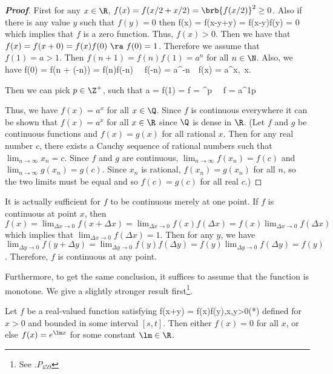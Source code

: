 \begin{proof}[\bf Proof]
First for any $x\in \R$, $f(x) = f(x/2 + x/2) = \brb{f(x/2)}^2 \geq 0$. Also if there is any value $y$ such that $f(y) = 0$ then
\be
f(x) = f(x-y+y) = f(x-y)f(y) = 0
\ee
which implies that $f$ is a zero function. Thus, $f(x)>0$. Then we have that $f(x) = f(x+0) = f(x)f(0) \ \ra\ f(0) = 1$. Therefore we assume that $f(1) = a>1$. Then $f(n+1) = f(n)f(1) = a^n$ for all $n\in\N$. Also, we have
\be
f(0) = f(n + (-n)) = f(n)f(-n) \ \ra\ f(-n) = a^{-n}\ \ra\ f(x) = a^x,\ x\in \Z.
\ee

Then we can pick $p\in \Z^+$, such that
\be
a = f(1) = f = ^p \ \ra\ f = a^{\frac 1p}
\ee

Thus, we have $f(x) = a^x$ for all $x\in \Q$. Since $f$ is continuous everywhere it can be shown that $f(x) =a^x$ for all $x\in\R$ since $\Q$ is dense in $\R$. (Let $f$ and $g$ be continuous functions and $f(x) =g(x)$ for all rational $x$. Then for any real number $c$, there exists a Cauchy sequence of rational numbers such that $\lim_{n\to\infty}x_n =c$. Since $f$ and $g$ are continuous, $\lim_{n\to \infty}f(x_n) = f(c)$ and $\lim_{n\to \infty}g(x_n) = g(c)$. Since $x_n$ is rational, $f(x_n) = g(x_n)$ for all $n$, so the two limits must be equal and so $f(c) = g(c)$ for all real $c$.)%
\end{proof}

\begin{remark}
It is actually sufficient for $f$ to be continuous merely at one point. If $f$ is continuous at point $x$, then $f(x) = \lim_{\Delta x \to 0}f(x+\Delta x) = \lim_{\Delta x \to 0}f(x)f(\Delta x) = f(x)\lim_{\Delta x \to 0}f(\Delta x) $ which implies that $\lim_{\Delta x \to 0}f(\Delta x) = 1$. Then for any $y$, we have $\lim_{\Delta y \to 0} f(y+\Delta y) = \lim_{\Delta y \to 0} f(y)f(\Delta y) = f(y) \lim_{\Delta y \to 0} f(\Delta y) = f(y)$. Therefore, $f$ is continuous at any point.
\end{remark}

Furthermore, to get the same conclusion, it suffices to assume that the function is monotone. We give a slightly stronger result first\footnote{See \cite{Feller_1968_v2}.$P_{459}$}.

\begin{theorem}\label{thm:function_product_is_function_of_sum_bounded_version}
Let $f$ be a real-valued function satisfying
\be
f(x+y) = f(x)f(y),\qquad x,y>0\qquad (*)
\ee
defined for $x>0$ and bounded in some interval $[s,t]$. Then either $f(x)=0$ for all $x$, or else $f(x) = e^{\lm x}$ for some constant $\lm\in\R$.
\end{theorem}

